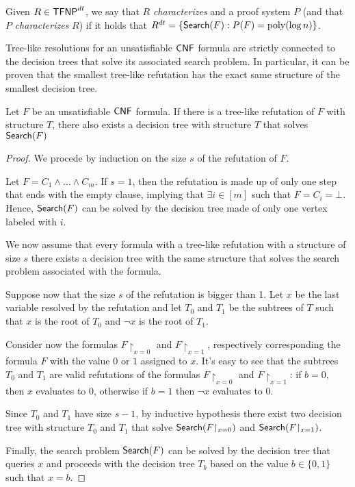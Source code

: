 \begin{definition}
    Given $R \in \mathsf{TFNP}^{dt}$, we say that $R$ \textit{characterizes} and a proof system $P$ (and that $P$ \textit{characterizes} $R$) if it holds that $R^{dt} = \{\mathsf{Search}(F) : P(F) = \mathrm{poly}(\log n)\}$.
\end{definition}


\newpage

Tree-like resolutions for an unsatisfiable $\mathsf{CNF}$ formula are strictly connected to the decision trees that solve its associated search problem. In particular, it can be proven that the smallest tree-like refutation has the exact same structure of the smallest decision tree. 

\begin{lemma} \label{lem:treeres_dt}
    \cite{treelike_res_size}
    Let $F$ be an unsatisfiable $\mathsf{CNF}$ formula. If there is a tree-like refutation of $F$ with structure $T$, there also exists a decision tree with structure $T$ that solves $\mathsf{Search}(F)$
\end{lemma}

\begin{proof}
    We procede by induction on the size $s$ of the refutation of $F$.

    Let $F = C_1 \land \ldots \land C_m$. If $s = 1$, then the refutation is made up of only one step that ends with the empty clause, implying that $\exists i \in [m]$ such that $F = C_i = \bot$. Hence, $\mathsf{Search}(F)$ can be solved by the decision tree made of only one vertex labeled with $i$.

    We now assume that every formula with a tree-like refutation with a structure of size $s$ there exists a decision tree with the same structure that solves the search problem associated with the formula.

    Suppose now that the size $s$ of the refutation is bigger than 1. Let $x$ be the last variable resolved by the refutation and let $T_0$ and $T_1$ be the subtrees of $T$ such that $x$ is the root of $T_0$ and $\lnot{x}$ is the root of $T_1$.

    Consider now the formulas $F{\upharpoonright_{x=0}}$ and $F{\upharpoonright_{x=1}}$, respectively corresponding the formula $F$ with the value $0$ or $1$ assigned to $x$. It's easy to see that the subtrees $T_0$ and $T_1$ are valid refutations of the formulas $F{\upharpoonright_{x=0}}$ and $F{\upharpoonright_{x=1}}$: if $b = 0$, then $x$ evaluates to $0$, otherwise if $b = 1$ then $\lnot{x}$ evaluates to 0.

    Since $T_0$ and $T_1$ have size $s-1$, by inductive hypothesis there exist two decision tree with structure $T_0$ and $T_1$ that solve $\mathsf{Search}(F{\upharpoonright_{x=0}})$ and $\mathsf{Search}(F{\upharpoonright_{x=1}})$.

    Finally, the search problem $\mathsf{Search}(F)$ can be solved by the decision tree that queries $x$ and proceeds with the decision tree $T_b$ based on the value $b \in \{0,1\}$ such that $x = b$.

\end{proof}

